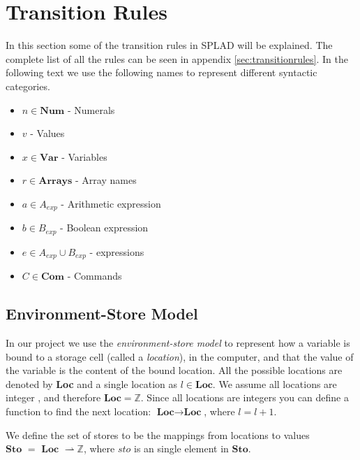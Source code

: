 

\section{Transition Rules}
In this section some of the transition rules in SPLAD will be explained. The complete list of all the rules can be seen in appendix \ref{sec:transitionrules}.
In the following text we use the following names to represent different syntactic categories.
\begin{itemize}
\item $n \in \textbf{Num}$ - Numerals
\item $v$ - Values
\item $x \in \textbf{Var}$ - Variables 
\item $r \in \textbf{Arrays}$ - Array names
\item $a \in A_{exp}$ - Arithmetic expression
\item $b \in B_{exp}$ - Boolean expression
\item $e \in A_{exp} \cup B_{exp}$ - expressions
\item $C \in \textbf{Com}$ - Commands
\end{itemize}

\subsection{Environment-Store Model}
In our project we use the \textit{environment-store model} to represent how a variable is bound to a storage cell (called a \textit{location}), in the computer, and that the value of the variable is the content of the bound location. All the possible locations are denoted by \textbf{Loc} and a single location as $l \in \textbf{Loc}$. We assume all locations are integer 
, and therefore $\textbf{Loc} = \mathbb{Z}$. Since all locations are integers you can define a function to find the next location: $\textbf{Loc} \rightarrow \textbf{Loc}$, where $l = l + 1$.  %

We define the set of stores to be the mappings from locations to values $\textbf{Sto } = \textbf{ Loc } \rightharpoonup \mathbb{Z}$, where $sto$ is an single element in $\textbf{Sto}$.

